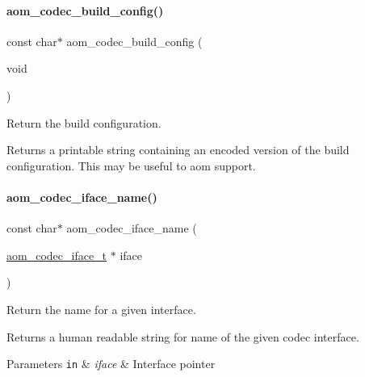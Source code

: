 \paragraph{\texorpdfstring{aom\+\_\+codec\+\_\+build\+\_\+config()}{aom\_codec\_build\_config()}}
{\footnotesize\ttfamily const char$\ast$ aom\+\_\+codec\+\_\+build\+\_\+config (\begin{DoxyParamCaption}\item[{void}]{ }\end{DoxyParamCaption})}



Return the build configuration. 

Returns a printable string containing an encoded version of the build configuration. This may be useful to aom support. \mbox{\label{group__codec_ga013b1f6d96b2cf9489396311a7e5179b}} 
\paragraph{\texorpdfstring{aom\+\_\+codec\+\_\+iface\+\_\+name()}{aom\_codec\_iface\_name()}}
{\footnotesize\ttfamily const char$\ast$ aom\+\_\+codec\+\_\+iface\+\_\+name (\begin{DoxyParamCaption}\item[{\hyperlink{group__codec_ga4ef55b44c762836d1550e11921bed403}{aom\+\_\+codec\+\_\+iface\+\_\+t} $\ast$}]{iface }\end{DoxyParamCaption})}



Return the name for a given interface. 

Returns a human readable string for name of the given codec interface.


\begin{DoxyParams}[1]{Parameters}
\mbox{\tt in}  & {\em iface} & Interface pointer \\
\hline
\end{DoxyParams}
\mbox{\label{group__codec_ga83c6525528574d1a88e73a9f605c9115}} 
